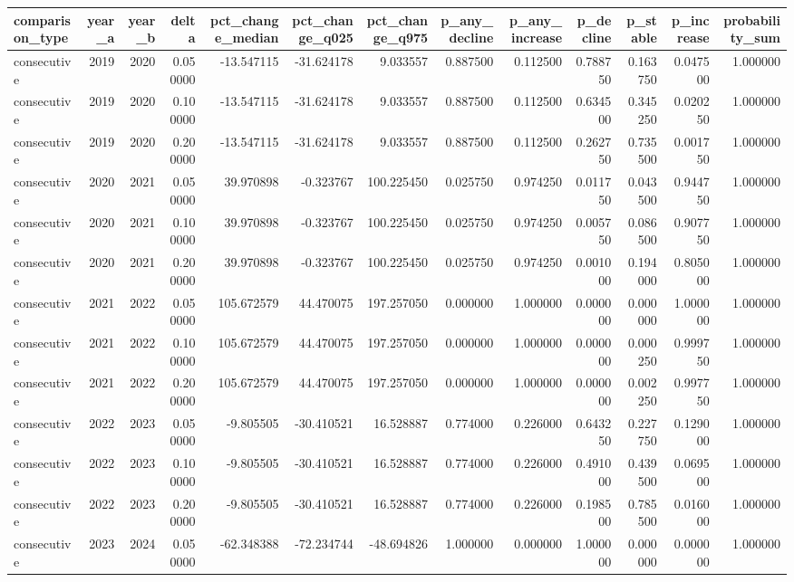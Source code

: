\begin{tabular}{lrrrrrrrrrrrr}
\toprule
comparison\_type & year\_a & year\_b & delta & pct\_change\_median & pct\_change\_q025 & pct\_change\_q975 & p\_any\_decline & p\_any\_increase & p\_decline & p\_stable & p\_increase & probability\_sum \\
\midrule
consecutive & 2019 & 2020 & 0.050000 & -13.547115 & -31.624178 & 9.033557 & 0.887500 & 0.112500 & 0.788750 & 0.163750 & 0.047500 & 1.000000 \\
consecutive & 2019 & 2020 & 0.100000 & -13.547115 & -31.624178 & 9.033557 & 0.887500 & 0.112500 & 0.634500 & 0.345250 & 0.020250 & 1.000000 \\
consecutive & 2019 & 2020 & 0.200000 & -13.547115 & -31.624178 & 9.033557 & 0.887500 & 0.112500 & 0.262750 & 0.735500 & 0.001750 & 1.000000 \\
consecutive & 2020 & 2021 & 0.050000 & 39.970898 & -0.323767 & 100.225450 & 0.025750 & 0.974250 & 0.011750 & 0.043500 & 0.944750 & 1.000000 \\
consecutive & 2020 & 2021 & 0.100000 & 39.970898 & -0.323767 & 100.225450 & 0.025750 & 0.974250 & 0.005750 & 0.086500 & 0.907750 & 1.000000 \\
consecutive & 2020 & 2021 & 0.200000 & 39.970898 & -0.323767 & 100.225450 & 0.025750 & 0.974250 & 0.001000 & 0.194000 & 0.805000 & 1.000000 \\
consecutive & 2021 & 2022 & 0.050000 & 105.672579 & 44.470075 & 197.257050 & 0.000000 & 1.000000 & 0.000000 & 0.000000 & 1.000000 & 1.000000 \\
consecutive & 2021 & 2022 & 0.100000 & 105.672579 & 44.470075 & 197.257050 & 0.000000 & 1.000000 & 0.000000 & 0.000250 & 0.999750 & 1.000000 \\
consecutive & 2021 & 2022 & 0.200000 & 105.672579 & 44.470075 & 197.257050 & 0.000000 & 1.000000 & 0.000000 & 0.002250 & 0.997750 & 1.000000 \\
consecutive & 2022 & 2023 & 0.050000 & -9.805505 & -30.410521 & 16.528887 & 0.774000 & 0.226000 & 0.643250 & 0.227750 & 0.129000 & 1.000000 \\
consecutive & 2022 & 2023 & 0.100000 & -9.805505 & -30.410521 & 16.528887 & 0.774000 & 0.226000 & 0.491000 & 0.439500 & 0.069500 & 1.000000 \\
consecutive & 2022 & 2023 & 0.200000 & -9.805505 & -30.410521 & 16.528887 & 0.774000 & 0.226000 & 0.198500 & 0.785500 & 0.016000 & 1.000000 \\
consecutive & 2023 & 2024 & 0.050000 & -62.348388 & -72.234744 & -48.694826 & 1.000000 & 0.000000 & 1.000000 & 0.000000 & 0.000000 & 1.000000 \\

\end{tabular}
